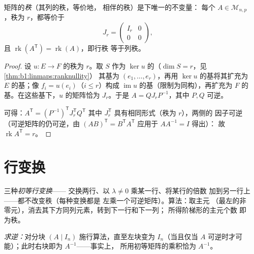 \begin{theorem}[秩的标准形]\label{thm:b1:matrices:rank}
矩阵的\emph{秩}（其列的秩，等价地，
相伴的秩）是下唯一的不变量：
每个 $A \in \mathcal{M}_{n,p}$，秩为 $r$，都等价于
\[
J_r = \begin{pmatrix} I_r & 0 \\ 0 & 0 \end{pmatrix},
\]
且 $\operatorname{rk}(A^{\mathsf T}) = \operatorname{rk}(A)$，即行秩
等于列秩。
\end{theorem}

\begin{proof}
设 $u \colon E \to F$ 的秩为 $r$。取 $S$ 作为
$\ker u$ 的（$\dim S = r$，见\cref{thm:b1:linmaps:ranknullity}）
其基为 $(e_1, \dots, e_r)$，再用 $\ker u$ 的基将其扩充为
$E$ 的基；像 $f_i = u(e_i)$（$i \leq r$）构成
$\operatorname{im} u$ 的基（限制为同构），再扩充为
$F$ 的基。在这些基下，$u$ 的矩阵恰为
$J_r$。于是 $A = Q J_r P^{-1}$，其中 $P, Q$ 可逆。

可得：$A^{\mathsf T} = (P^{-1})^{\mathsf T} J_r^{\mathsf T} Q^{\mathsf T}$
其中 $J_r^{\mathsf T}$ 具有相同形式（秩为 $r$），两侧的
因子可逆（可逆矩阵的仍可逆，由
$(AB)^{\mathsf T} = B^{\mathsf T}A^{\mathsf T}$ 应用于 $AA^{-1} = I$ 得出）：
故 $\operatorname{rk} A^{\mathsf T} = r$。
\end{proof}

\section{行变换}

\begin{method}[矩阵的高斯消元法]\label{met:b1:matrices:gauss}
三种\emph{初等行变换}——
交换两行、以 $\lambda \neq 0$ 乘某一行、将某行的倍数
加到另一行上——都不改变秩（每种变换都是
左乘一个可逆矩阵）。算法：取主元
（最左的非零元），消去其下方同列元素，转到下一行和下一列；
所得阶梯形的主元个数
即为秩。

\emph{求逆：}对分块 $(A \mid
I_n)$ 施行算法，直至左块变为 $I_n$（当且仅当 $A$
可逆时才可能）；此时右块即为 $A^{-1}$——事实上，
所用初等矩阵的乘积恰为 $A^{-1}$。
\end{method}

